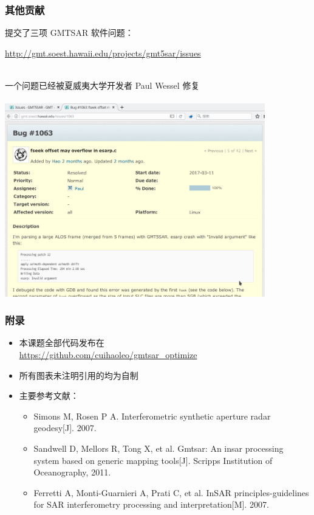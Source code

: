 \documentclass{beamer}
\begin{document}
\begin{frame}
    \frametitle{其他贡献}

    提交了三项 GMTSAR 软件问题：
    \begin{scriptsize} \url{http://gmt.soest.hawaii.edu/projects/gmt5sar/issues} \end{scriptsize}\\
    一个问题已经被夏威夷大学开发者 Paul Wessel 修复 \\~\\

    \centering
    \includegraphics[width=0.85\textwidth,trim={0 5cm 0 0},clip]{figures/issue.png}
\end{frame}


\begin{frame}
    \frametitle{附录}

    \begin{itemize}
        \item 本课题全部代码发布在\\ \url{https://github.com/cuihaoleo/gmtsar_optimize}
        \item 所有图表未注明引用的均为自制
        \item 主要参考文献：\\
        \begin{itemize}
            \scriptsize
            \item[] Simons M, Rosen P A. Interferometric synthetic aperture radar geodesy[J]. 2007.
            \item[] Sandwell D, Mellors R, Tong X, et al. Gmtsar: An insar processing system based on generic mapping tools[J]. Scripps Institution of Oceanography, 2011.
            \item[] Ferretti A, Monti-Guarnieri A, Prati C, et al. InSAR principles-guidelines for SAR interferometry processing and interpretation[M]. 2007.
        \end{itemize}
    \end{itemize}
\end{frame}
\end{document}
